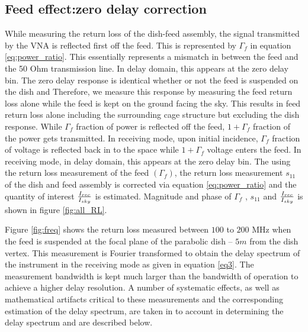 \documentclass[twocolumn]{emulateapj}
\begin{document}
\subsection{\textbf{Feed effect:zero delay correction}}

While measuring the return loss of the dish-feed assembly, the signal transmitted by the VNA is reflected first off the feed. This is represented by $\Gamma_{f}$ in equation \ref{eq:power_ratio}. This essentially represents a mismatch in between the feed and the 50 Ohm transmission line. In delay domain, this appears at the zero delay bin. The zero delay response is identical whether or not the feed is suspended on the dish and  Therefore, we measure this response by measuring the feed return loss alone while the feed is kept on the ground facing the sky. This results in feed return loss alone including the surrounding cage structure but excluding the dish response. While $\Gamma_{f}$ fraction of power is reflected off the feed, $1+\Gamma_{f}$ fraction of the power gets transmitted. In receiving mode, upon initial incidence, $\Gamma_{f}$ fraction of voltage is reflected back in to the space while $1+\Gamma_{f}$ voltage enters the feed. In receiving mode, in delay domain, this appears at the zero delay bin.
The using the return loss measurement of the feed $(\Gamma_{f})$, the return loss measurement $s_{11}$ of the dish and feed assembly is corrected via equation \ref{eq:power_ratio} and the quantity of interest ${I_{rec}\over I_{sky}}$ is estimated. Magnitude and phase of $\Gamma_{f}$ , $s_{11}$ and ${I_{rec}\over I_{sky}}$ is shown in figure \ref{fig:all_RL}.



Figure \ref{fig:freq} shows the return loss measured between $100$ to
$200$ MHz when the feed is suspended at the focal plane of the parabolic dish -- $5m$ from the dish vertex. This measurement is Fourier transformed to obtain the delay spectrum of the instrument in the receiving mode as given in equation \ref{eq3}. The measurement bandwidth is kept much larger than the bandwidth of operation to achieve a higher delay resolution. A number of systematic effects, as well as mathematical artifacts critical to these measurements and the corresponding estimation of the delay spectrum, are taken in to account in determining the delay spectrum and are described below. 
\end{document}
